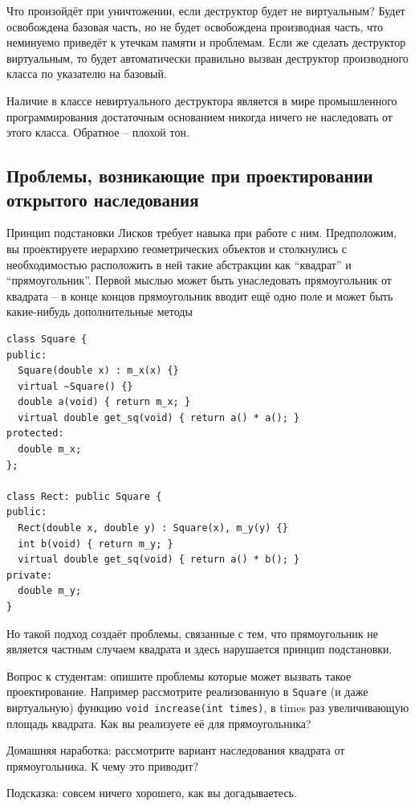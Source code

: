 \documentclass[a4paper,12pt,oneside]{article}
\begin{document}
Что произойдёт при уничтожении, если деструктор будет не виртуальным? Будет освобождена базовая часть, но не будет освобождена производная часть, что неминуемо приведёт к утечкам памяти и проблемам. Если же сделать деструктор виртуальным, то будет автоматически правильно вызван деструктор производного класса по указателю на базовый.

Наличие в классе невиртуального деструктора является в мире промышленного программирования достаточным основанием никогда ничего не наследовать от этого класса. Обратное – плохой тон. 

\subsection{Проблемы, возникающие при проектировании открытого наследования}

Принцип подстановки Лисков требует навыка при работе с ним. Предположим, вы проектируете иерархию геометрических объектов и столкнулись с необходимостью расположить в ней такие абстракции как ``квадрат'' и ``прямоугольник''. Первой мыслью может быть унаследовать прямоугольник от квадрата – в конце концов прямоугольник вводит ещё одно поле и может быть какие-нибудь дополнительные методы

\begin{lstlisting}
class Square {
public:
  Square(double x) : m_x(x) {}
  virtual ~Square() {}
  double a(void) { return m_x; }
  virtual double get_sq(void) { return a() * a(); }
protected:
  double m_x;
};

class Rect: public Square {
public:
  Rect(double x, double y) : Square(x), m_y(y) {}
  int b(void) { return m_y; }
  virtual double get_sq(void) { return a() * b(); }
private:
  double m_y;
}
\end{lstlisting}

Но такой подход создаёт проблемы, связанные с тем, что прямоугольник не является частным случаем квадрата и здесь нарушается принцип подстановки. 

Вопрос к студентам: опишите проблемы которые может вызвать такое проектирование. Например рассмотрите реализованную в \lstinline!Square! (и даже виртуальную) функцию \lstinline!void increase(int times)!, в times раз увеличивающую площадь квадрата. Как вы реализуете её для прямоугольника?

Домашняя наработка: рассмотрите вариант наследования квадрата от прямоугольника. К чему это приводит?

Подсказка: совсем ничего хорошего, как вы догадываетесь.
\end{document}
